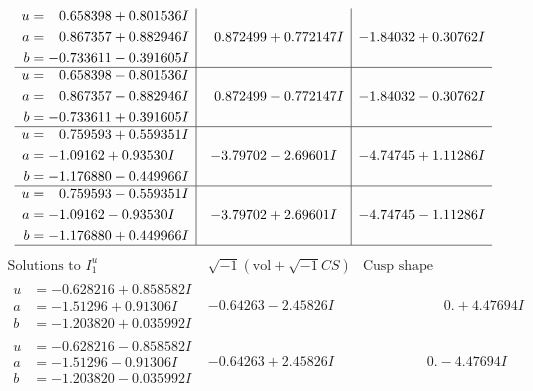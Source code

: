 \documentclass[1p]{elsarticle_modified}
\theoremstyle{definition}
\newcommand{\I}{\sqrt{-1}}
\begin{document}
$$\begin{array}{c|c|c}
\begin{aligned}
u &= \phantom{-}0.658398 + 0.801536 I \\
a &= \phantom{-}0.867357 + 0.882946 I \\
b &= -0.733611 - 0.391605 I\end{aligned}
 & \phantom{-}0.872499 + 0.772147 I & -1.84032 + 0.30762 I \\ \hline\begin{aligned}
u &= \phantom{-}0.658398 - 0.801536 I \\
a &= \phantom{-}0.867357 - 0.882946 I \\
b &= -0.733611 + 0.391605 I\end{aligned}
 & \phantom{-}0.872499 - 0.772147 I & -1.84032 - 0.30762 I \\ \hline\begin{aligned}
u &= \phantom{-}0.759593 + 0.559351 I \\
a &= -1.09162 + 0.93530 I \\
b &= -1.176880 - 0.449966 I\end{aligned}
 & -3.79702 - 2.69601 I & -4.74745 + 1.11286 I \\ \hline\begin{aligned}
u &= \phantom{-}0.759593 - 0.559351 I \\
a &= -1.09162 - 0.93530 I \\
b &= -1.176880 + 0.449966 I\end{aligned}
 & -3.79702 + 2.69601 I & -4.74745 - 1.11286 I\\
 \hline 
 \end{array}$$\newpage$$\begin{array}{c|c|c}  
\text{Solutions to }I^u_{1}& \I (\text{vol} + \sqrt{-1}CS) & \text{Cusp shape}\\
 \hline 
\begin{aligned}
u &= -0.628216 + 0.858582 I \\
a &= -1.51296 + 0.91306 I \\
b &= -1.203820 + 0.035992 I\end{aligned}
 & -0.64263 - 2.45826 I & \phantom{-0.000000 -}0. + 4.47694 I \\ \hline\begin{aligned}
u &= -0.628216 - 0.858582 I \\
a &= -1.51296 - 0.91306 I \\
b &= -1.203820 - 0.035992 I\end{aligned}
 & -0.64263 + 2.45826 I & \phantom{-0.000000 } 0. - 4.47694 I \\ \hline\begin{aligned}

\end{aligned}
\end{array}$$
\end{document}
